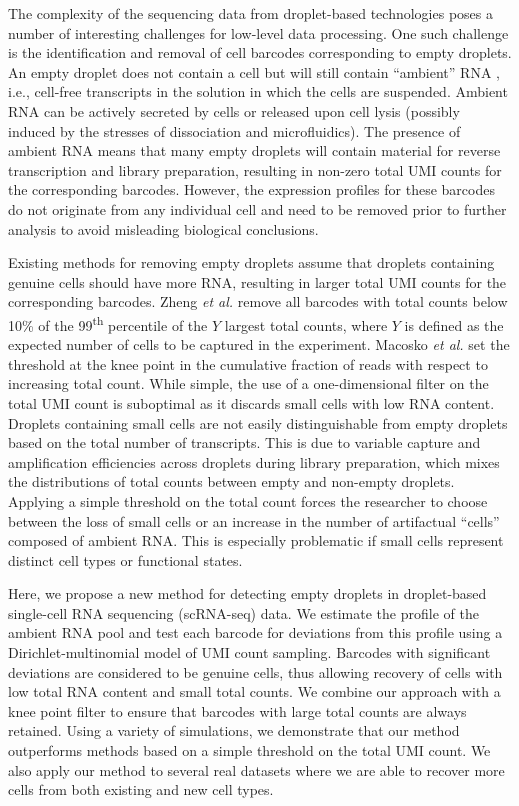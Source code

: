 \documentclass[10pt,letterpaper]{article}
\begin{document}
The complexity of the sequencing data from droplet-based technologies poses a number of interesting challenges for low-level data processing.
One such challenge is the identification and removal of cell barcodes corresponding to empty droplets.
An empty droplet does not contain a cell but will still contain ``ambient'' RNA \cite{macosko2015highly}, i.e., cell-free transcripts in the solution in which the cells are suspended.
Ambient RNA can be actively secreted by cells or released upon cell lysis (possibly induced by the stresses of dissociation and microfluidics).
The presence of ambient RNA means that many empty droplets will contain material for reverse transcription and library preparation, resulting in non-zero total UMI counts for the corresponding barcodes.
However, the expression profiles for these barcodes do not originate from any individual cell and need to be removed prior to further analysis to avoid misleading biological conclusions.

Existing methods for removing empty droplets assume that droplets containing genuine cells should have more RNA, resulting in larger total UMI counts for the corresponding barcodes.
Zheng \textit{et al.} \cite{zheng2017massively} remove all barcodes with total counts below 10\% of the 99\textsuperscript{th} percentile of the $Y$ largest total counts, where $Y$ is defined as the expected number of cells to be captured in the experiment.
Macosko \textit{et al.} \cite{macosko2015highly} set the threshold at the knee point in the cumulative fraction of reads with respect to increasing total count.
While simple, the use of a one-dimensional filter on the total UMI count is suboptimal as it discards small cells with low RNA content.
Droplets containing small cells are not easily distinguishable from empty droplets based on the total number of transcripts.
This is due to variable capture and amplification efficiencies across droplets during library preparation, which mixes the distributions of total counts between empty and non-empty droplets.
Applying a simple threshold on the total count forces the researcher to choose between the loss of small cells or an increase in the number of artifactual ``cells'' composed of ambient RNA.
This is especially problematic if small cells represent distinct cell types or functional states.

Here, we propose a new method for detecting empty droplets in droplet-based single-cell RNA sequencing (scRNA-seq) data.
We estimate the profile of the ambient RNA pool and test each barcode for deviations from this profile using a Dirichlet-multinomial model of UMI count sampling.
Barcodes with significant deviations are considered to be genuine cells, thus allowing recovery of cells with low total RNA content and small total counts.
We combine our approach with a knee point filter to ensure that barcodes with large total counts are always retained.
Using a variety of simulations, we demonstrate that our method outperforms methods based on a simple threshold on the total UMI count.
We also apply our method to several real datasets where we are able to recover more cells from both existing and new cell types.
\end{document}

